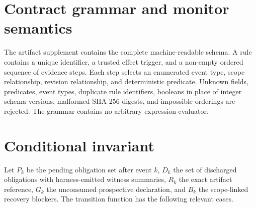 \section{Contract grammar and monitor semantics}
\label{app:contract}

The artifact supplement contains the complete machine-readable schema. A rule
contains a unique identifier, a trusted effect trigger, and a non-empty ordered
sequence of evidence steps. Each step selects an enumerated event type, scope
relationship, revision relationship, and deterministic predicate. Unknown
fields, predicates, event types, duplicate rule identifiers, booleans in place
of integer schema versions, malformed SHA-256 digests, and impossible orderings
are rejected. The grammar contains no arbitrary expression evaluator.

\section{Conditional invariant}
\label{app:invariant}

Let $P_k$ be the pending obligation set after event $k$, $D_k$ the set of
discharged obligations with harness-emitted witness summaries, $R_k$ the exact
artifact reference, $G_k$ the unconsumed prospective declaration, and $B_k$ the
scope-linked recovery blockers. The transition function has the following
relevant cases.

